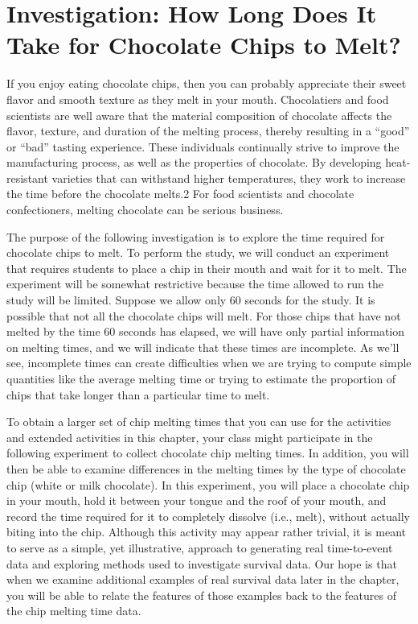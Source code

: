 \documentclass[
]{report}
\begin{document}
\section{\texorpdfstring{\textbf{Investigation: How Long Does It Take for Chocolate Chips to Melt?}}{Investigation: How Long Does It Take for Chocolate Chips to Melt?}}\label{investigation-how-long-does-it-take-for-chocolate-chips-to-melt}

If you enjoy eating chocolate chips, then you can probably appreciate their sweet flavor and smooth texture
as they melt in your mouth. Chocolatiers and food scientists are well aware that the material composition
of chocolate affects the flavor, texture, and duration of the melting process, thereby resulting in a ``good'' or
``bad'' tasting experience. These individuals continually strive to improve the manufacturing process, as well
as the properties of chocolate. By developing heat-resistant varieties that can withstand higher temperatures,
they work to increase the time before the chocolate melts.2 For food scientists and chocolate confectioners,
melting chocolate can be serious business.

The purpose of the following investigation is to explore the time required for chocolate chips to melt. To
perform the study, we will conduct an experiment that requires students to place a chip in their mouth and
wait for it to melt. The experiment will be somewhat restrictive because the time allowed to run the study
will be limited. Suppose we allow only 60 seconds for the study. It is possible that not all the chocolate chips
will melt. For those chips that have not melted by the time 60 seconds has elapsed, we will have only partial
information on melting times, and we will indicate that these times are incomplete. As we'll see, incomplete
times can create difficulties when we are trying to compute simple quantities like the average melting time or
trying to estimate the proportion of chips that take longer than a particular time to melt.

To obtain a larger set of chip melting times that you can use for the activities and extended activities
in this chapter, your class might participate in the following experiment to collect chocolate chip melting
times. In addition, you will then be able to examine differences in the melting times by the type of chocolate
chip (white or milk chocolate). In this experiment, you will place a chocolate chip in your mouth, hold it
between your tongue and the roof of your mouth, and record the time required for it to completely dissolve
(i.e., melt), without actually biting into the chip. Although this activity may appear rather trivial, it is meant
to serve as a simple, yet illustrative, approach to generating real time-to-event data and exploring methods
used to investigate survival data. Our hope is that when we examine additional examples of real survival data
later in the chapter, you will be able to relate the features of those examples back to the features of the chip
melting time data.
\end{document}
